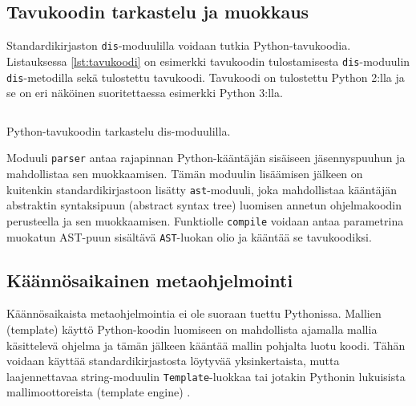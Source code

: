 \documentclass[finnish]{tktltiki2}
\theoremstyle{definition}
\theoremstyle{remark}
\begin{document}
\subsection{Tavukoodin tarkastelu ja muokkaus}

Standardikirjaston \verb|dis|-moduulilla voidaan tutkia Python-tavukoodia. Listauksessa \ref{lst:tavukoodi} on esimerkki tavukoodin tulostamisesta \verb|dis|-moduulin \verb|dis|-metodilla sekä tulostettu tavukoodi. Tavukoodi on tulostettu Python 2:lla ja se on eri näköinen suoritettaessa esimerkki Python 3:lla.


\begin{listing}
    \inputminted[linenos,frame=single,framesep=10pt]{python}{code/tavukoodi.py}
    \caption{Python-tavukoodin tarkastelu dis-moduulilla.}
    \label{lst:tavukoodi}
\end{listing}

Moduuli \verb|parser| antaa rajapinnan Python-kääntäjän sisäiseen jäsennyspuuhun ja mahdollistaa sen muokkaamisen. Tämän moduulin lisäämisen jälkeen on kuitenkin standardikirjastoon lisätty \verb|ast|-moduuli, joka mahdollistaa kääntäjän abstraktin syntaksipuun (abstract syntax tree) luomisen annetun ohjelmakoodin perusteella ja sen muokkaamisen. Funktiolle \verb|compile| voidaan antaa parametrina muokatun AST-puun sisältävä \verb|AST|-luokan olio ja kääntää se tavukoodiksi.





\subsection{Käännösaikainen metaohjelmointi}

Käännösaikaista metaohjelmointia ei ole suoraan tuettu Pythonissa. Mallien (template) käyttö Python-koodin luomiseen on mahdollista ajamalla mallia käsittelevä ohjelma ja tämän jälkeen kääntää mallin pohjalta luotu koodi. Tähän voidaan käyttää standardikirjastosta löytyvää yksinkertaista, mutta laajennettavaa string-moduulin \verb|Template|-luokkaa tai jotakin Pythonin lukuisista mallimoottoreista (template engine) \cite{Templating}.
\end{document}
